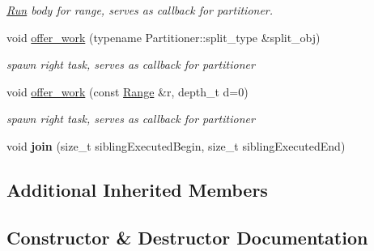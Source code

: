 \begin{DoxyCompactItemize}
\begin{DoxyCompactList}\small\item\em \hyperlink{structRun}{Run} body for range, serves as callback for partitioner. \end{DoxyCompactList}\item 
\hypertarget{classtbb_1_1interface7_1_1internal_1_1start__for_a37df8fad8ea7b049204d78c4c35836df}{}void \hyperlink{classtbb_1_1interface7_1_1internal_1_1start__for_a37df8fad8ea7b049204d78c4c35836df}{offer\+\_\+work} (typename Partitioner\+::split\+\_\+type \&split\+\_\+obj)\label{classtbb_1_1interface7_1_1internal_1_1start__for_a37df8fad8ea7b049204d78c4c35836df}

\begin{DoxyCompactList}\small\item\em spawn right task, serves as callback for partitioner \end{DoxyCompactList}\item 
\hypertarget{classtbb_1_1interface7_1_1internal_1_1start__for_a612a89fb10921dfa0b0aae00aaf2e4a5}{}void \hyperlink{classtbb_1_1interface7_1_1internal_1_1start__for_a612a89fb10921dfa0b0aae00aaf2e4a5}{offer\+\_\+work} (const \hyperlink{classtbb_1_1blocked__range}{Range} \&r, depth\+\_\+t d=0)\label{classtbb_1_1interface7_1_1internal_1_1start__for_a612a89fb10921dfa0b0aae00aaf2e4a5}

\begin{DoxyCompactList}\small\item\em spawn right task, serves as callback for partitioner \end{DoxyCompactList}\item 
\hypertarget{classtbb_1_1interface7_1_1internal_1_1start__for_a78bb2cd5e67555fdce8f67437a1b5dfc}{}void {\bfseries join} (size\+\_\+t sibling\+Executed\+Begin, size\+\_\+t sibling\+Executed\+End)\label{classtbb_1_1interface7_1_1internal_1_1start__for_a78bb2cd5e67555fdce8f67437a1b5dfc}

\end{DoxyCompactItemize}
\subsection*{Additional Inherited Members}


\subsection{Constructor \& Destructor Documentation}
\hypertarget{classtbb_1_1interface7_1_1internal_1_1start__for_a2f95305a0cf2f6cbda317c03e4f0670e}{}

